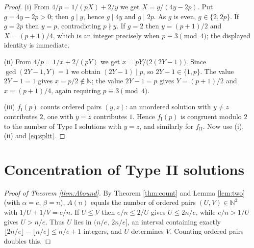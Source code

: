 \documentclass[11pt,reqno]{amsart}
\theoremstyle{plain}
\theoremstyle{definition}
\numberwithin{equation}{section}
\newcommand{\N}{\mathbb{N}}
\newcommand{\fI}{f_{\mathrm{I}}}
\newcommand{\fII}{f_{\mathrm{II}}}
\begin{document}
\begin{proof}
(i) From $4/p=1/(pX)+2/y$ we get $X=y/(4y-2p)$. Put $g=4y-2p>0$; then $g\mid y$,
hence $g\mid 4y$ and $g\mid2p$. As $g$ is even, $g\in\{2,2p\}$. If $g=2p$ then $y=p$,
contradicting $p\nmid y$. If $g=2$ then $y=(p+1)/2$ and $X=(p+1)/4$, which is an
integer precisely when $p\equiv3\pmod4$; the displayed identity is immediate.

(ii) From $4/p=1/x+2/(pY)$ we get $x=pY/\bigl(2(2Y-1)\bigr)$. Since
$\gcd(2Y-1,Y)=1$ we obtain $(2Y-1)\mid p$, so $2Y-1\in\{1,p\}$. The value $2Y-1=1$
gives $x=p/2\notin\N$; the value $2Y-1=p$ gives $Y=(p+1)/2$ and $x=(p+1)/4$, again
requiring $p\equiv3\pmod4$.

(iii) $\fI(p)$ counts ordered pairs $(y,z)$: an unordered solution with $y\ne z$
contributes $2$, one with $y=z$ contributes $1$. Hence $\fI(p)$ is congruent modulo
$2$ to the number of Type I solutions with $y=z$, and similarly for $\fII$. Now use
(i), (ii) and \eqref{eq:split}.
\end{proof}

\section{Concentration of Type II solutions}\label{sec:conc}

\begin{proof}[Proof of Theorem \ref{thm:Abound}]
By Theorem \ref{thm:count} and Lemma \ref{lem:two} (with $\alpha=e$, $\beta=n$),
$A(n)$ equals the number of ordered pairs $(U,V)\in\N^{2}$ with $1/U+1/V=e/n$.
If $U\le V$ then $e/n\le2/U$ gives $U\le2n/e$, while $e/n>1/U$ gives $U>n/e$. Thus
$U$ lies in $(n/e,\,2n/e]$, an interval containing exactly
$\lfloor 2n/e\rfloor-\lfloor n/e\rfloor\le n/e+1$
integers, and $U$ determines $V$.
Counting ordered pairs doubles this.
\end{proof}
\end{document}
